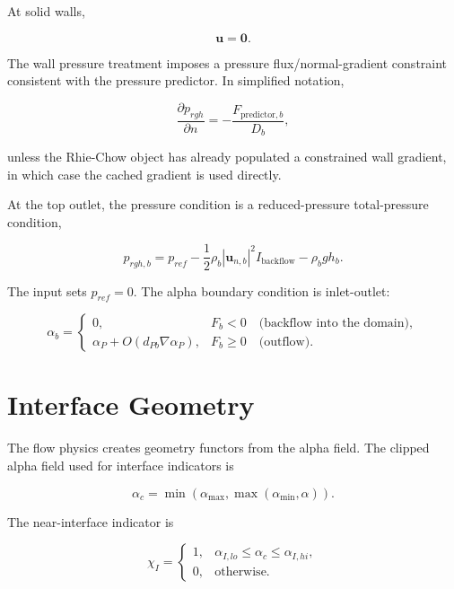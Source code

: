 \documentclass[11pt]{article}
\newcommand{\grad}{\nabla}
\begin{document}
At solid walls,

\begin{equation}
  \mathbf{u}=\mathbf{0}.
\end{equation}

The wall pressure treatment imposes a pressure flux/normal-gradient constraint
consistent with the pressure predictor.  In simplified notation,

\begin{equation}
  \frac{\partial p_{rgh}}{\partial n}
  =
  -\frac{F_{\mathrm{predictor},b}}{D_b},
  \label{eq:wall-pressure-gradient}
\end{equation}

unless the Rhie-Chow object has already populated a constrained wall gradient,
in which case the cached gradient is used directly.

At the top outlet, the pressure condition is a reduced-pressure total-pressure
condition,

\begin{equation}
  p_{rgh,b}
  =
  p_{ref}
  -
  \frac{1}{2}\rho_b
  |\mathbf{u}_{n,b}|^2 I_{\mathrm{backflow}}
  -
  \rho_b gh_b.
  \label{eq:top-prgh}
\end{equation}

The input sets \(p_{ref}=0\).  The alpha boundary condition is inlet-outlet:

\begin{equation}
  \alpha_b =
  \begin{cases}
    0, & F_b<0\quad\text{(backflow into the domain)},\\
    \alpha_P + O(d_{Pb}\grad\alpha_P), & F_b\ge 0\quad\text{(outflow)}.
  \end{cases}
\end{equation}

\section{Interface Geometry}

The flow physics creates geometry functors from the alpha field.  The clipped
alpha field used for interface indicators is

\begin{equation}
  \alpha_c=\min(\alpha_{\max},\max(\alpha_{\min},\alpha)).
\end{equation}

The near-interface indicator is

\begin{equation}
  \chi_I =
  \begin{cases}
    1, & \alpha_{I,lo}\le \alpha_c\le \alpha_{I,hi},\\
    0, & \text{otherwise}.
  \end{cases}
\end{equation}
\end{document}
